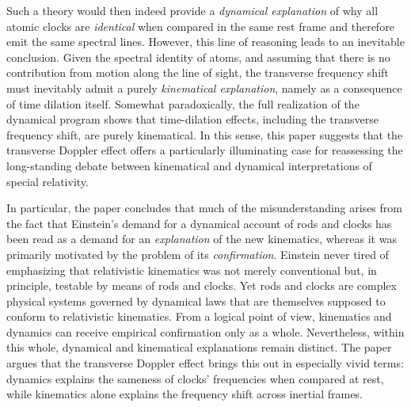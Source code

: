 \documentclass[submitted,12pt]{article}
\newcommand{\tDe}{transverse Doppler effect\xspace}
\begin{document}
Such a theory would then indeed provide a \emph{dynamical explanation} of why all atomic clocks are \emph{identical} when compared in the same rest frame and therefore emit the same spectral lines. However, this line of reasoning leads to an inevitable conclusion. Given the spectral identity of atoms, and assuming that there is no contribution from motion along the line of sight, the transverse frequency shift must inevitably admit a purely \emph{kinematical explanation}, namely as a consequence of time dilation itself. Somewhat paradoxically, the full realization of the dynamical program shows that time-dilation effects, including the transverse frequency shift, are purely kinematical. In this sense, this paper suggests that the \tDe offers a particularly illuminating case for reassessing the long-standing debate between kinematical and dynamical interpretations of special relativity. 

In particular, the paper concludes that much of the misunderstanding arises from the fact that Einstein’s demand for a dynamical account of rods and clocks has been read as a demand for an \emph{explanation} of the new kinematics, whereas it was primarily motivated by the problem of its \emph{confirmation}. Einstein never tired of emphasizing that relativistic kinematics was not merely conventional but, in principle, testable by means of rods and clocks. Yet rods and clocks are complex physical systems governed by dynamical laws that are themselves supposed to conform to relativistic kinematics. From a logical point of view, kinematics and dynamics can receive empirical confirmation only as a whole. Nevertheless, within this whole, dynamical and kinematical explanations remain distinct. The paper argues that the \tDe brings this out in especially vivid terms: dynamics explains the sameness of clocks’ frequencies when compared at rest, while kinematics alone explains the frequency shift across inertial frames.
\end{document}
